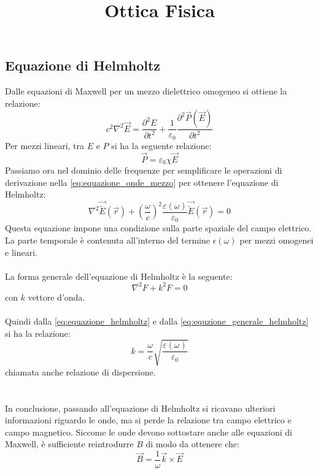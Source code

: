 \documentclass{article}
\title{Ottica Fisica}
\author{}
\date{}
\theoremstyle{remark}
\begin{document}
\maketitle

\subsection*{Equazione di Helmholtz}
Dalle equazioni di Maxwell per un mezzo dielettrico omogeneo si ottiene la relazione:
\begin{equation} \label{eq:equazione_onde_mezzo}
c^2\nabla^2 \overrightarrow{E} = \frac{\partial^2 E}{\partial t^2} + \frac{1}{\varepsilon_0} \frac{\partial^2 \overrightarrow{P}(\overrightarrow{E})}{\partial t^2}
\end{equation}
Per mezzi lineari, tra $E$ e $P$ si ha la seguente relazione:
\begin{equation*}
\overrightarrow{P} = \varepsilon_0 \chi \overrightarrow{E}
\end{equation*}
Passiamo ora nel dominio delle frequenze per semplificare le operazioni di derivazione nella \eqref{eq:equazione_onde_mezzo} per ottenere l'equazione di Helmholtz:
\begin{equation}	\label{eq:equazione_helmholtz}
\nabla^2 \overrightarrow{\tilde{E}}(\overrightarrow{r}) + \left(\frac{\omega}{c}\right)^2 \frac{\varepsilon(\omega)}{\varepsilon_0} \overrightarrow{\tilde{E}}(\overrightarrow{r}) = 0
\end{equation}
Questa equazione impone una condizione sulla parte spaziale del campo elettrico. La parte temporale è contenuta all'interno del termine $\epsilon(\omega)$ per mezzi omogenei e lineari.\\
\\
La forma generale dell'equazione di Helmholtz è la seguente:
\begin{equation} 	\label{eq:equzione_generale_helmholtz}
\nabla^2 F + k^2 F = 0
\end{equation}
con $k$ vettore d'onda.\\
\\
Quindi dalla \eqref{eq:equazione_helmholtz} e dalla \eqref{eq:equzione_generale_helmholtz} si ha la relazione:
\begin{equation*}
k = \frac{\omega}{c} \sqrt{\frac{\varepsilon(\omega)}{\varepsilon_0}}
\end{equation*}
chiamata anche relazione di dispersione.\\
\\
\\
In conclusione, passando all'equazione di Helmholtz si ricavano ulteriori informazioni riguardo le onde, ma si perde la relazione tra campo elettrico e campo magnetico. Siccome le onde devono sottostare anche alle equazioni di Maxwell, è sufficiente reintrodurre $B$ di modo da ottenere che:
\begin{equation*}
\overrightarrow{B} = \frac{1}{\omega} \overrightarrow{k} \times \overrightarrow{E}
\end{equation*}
\end{document}
